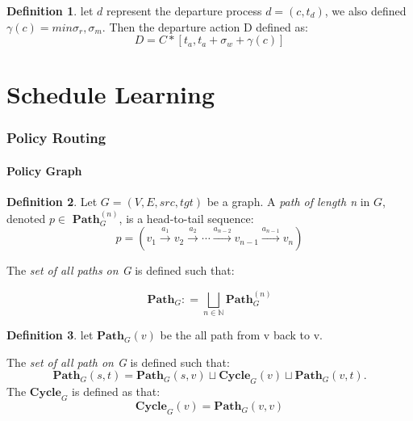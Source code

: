 \documentclass{article}
\theoremstyle{definition}
\newtheorem{definition}{Definition}[section]
\theoremstyle{remark}
\theoremstyle{theorem}
\theoremstyle{definition}
\newcommand{\path}[2]{\mathbf{Path}^{#2}_{#1}}
\newcommand{\pathall}[1]{\mathbf{Path}_{#1}}
\newcommand{\labeledarrow}[1]{\stackrel{#1}{\rightarrow}}
\newcommand{\cyclepath}[1]{\mathbf{Cycle}_{#1}}
\begin{document}
	\begin{definition}
		let $d$ represent the departure process $d = (c, t_d)$, we also defined $\gamma(c) = min{\sigma_r,\sigma_m}.$ Then the departure action D defined as:
		\[
		D = C * [t_a, t_a + \sigma_w + \gamma(c)]
		\]
	\end{definition}
	
	
	\part{Schedule Learning}
	
	\section{Policy Routing}
	
	\subsection{Policy Graph}
	
	\begin{definition} 
		Let $G = (V, E, src, tgt)$ be a graph. A \emph{path of length n} in $G$, denoted $p \in$ $\path{G}{(n)}$, is a head-to-tail sequence:
		\[
		p = (v_{1}   \labeledarrow{a_{1}}   v_{2}   \labeledarrow{a_{2}}  \cdots   \labeledarrow{a_{n-2}}  v_{n-1}   \labeledarrow{a_{n-1}}   v_{n})
		\]
		
		The \emph{set of all paths on G} is defined such that: 
		
		\[
		\pathall{G} : = \bigsqcup_{n \in \mathbb{N}}{\path{G}{(n)}}
		\]
	\end{definition}
	


	\begin{definition}
			let $\pathall{G}(v)$ be the all path from v back to v.
			
			The \emph{set of all path on G} is defined such that:
			\[
			\pathall{G}(s,t) = \pathall{G}(s,v)\sqcup \cyclepath{G}(v) \sqcup \pathall{G}(v,t).
			\]
			The $\cyclepath{G}$ is defined as that:
			\[
			\cyclepath{G}(v) = \pathall{G}(v,v)
			\]
		

	\end{definition}
	
	
		
	
\end{document}
